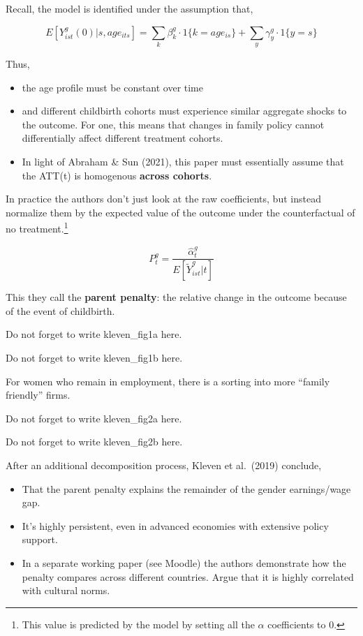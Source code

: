 \documentclass[
  letterpaper,
  DIV=11,
  numbers=noendperiod]{scrreprt}
\providecommand{\tightlist}{%
  \setlength{\itemsep}{0pt}\setlength{\parskip}{0pt}}\usepackage{longtable,booktabs,array}
\theoremstyle{definition}
\theoremstyle{remark}
\begin{document}
Recall, the model is identified under the assumption that,

\[
E[Y^g_{ist}(0)|s,age_{its}] = \sum_{k}\beta^g_k\cdot1\{k=age_{is}\}+\sum_y\gamma^g_y\cdot1\{y=s\}
\]

Thus,

\begin{itemize}
\tightlist
\item
  the age profile must be constant over time
\item
  and different childbirth cohorts must experience similar aggregate
  shocks to the outcome. For one, this means that changes in family
  policy cannot differentially affect different treatment cohorts.
\item
  In light of Abraham \& Sun (2021), this paper must essentially assume
  that the ATT(t) is homogenous \textbf{across cohorts}.
\end{itemize}

In practice the authors don't just look at the raw coefficients, but
instead normalize them by the expected value of the outcome under the
counterfactual of no treatment.\footnote{This value is predicted by the
  model by setting all the \(\alpha\) coefficients to 0.}

\[
P^g_t = \frac{\hat{\alpha}^g_t}{E[\tilde{Y}^g_{ist}|t]}
\]

This they call the \textbf{parent penalty}: the relative change in the
outcome because of the event of childbirth.

Do not forget to write kleven\_fig1a here.

Do not forget to write kleven\_fig1b here.

For women who remain in employment, there is a sorting into more
``family friendly'' firms.

Do not forget to write kleven\_fig2a here.

Do not forget to write kleven\_fig2b here.

After an additional decomposition process, Kleven et al.~(2019)
conclude,

\begin{itemize}
\tightlist
\item
  That the parent penalty explains the remainder of the gender
  earnings/wage gap.
\item
  It's highly persistent, even in advanced economies with extensive
  policy support.
\item
  In a separate working paper (see Moodle) the authors demonstrate how
  the penalty compares across different countries. Argue that it is
  highly correlated with cultural norms.
\end{itemize}
\end{document}
